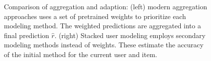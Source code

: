 \begin{figure}[t]
\begin{framed}
\begin{minipage}{0.49\textwidth}
  \end{minipage} 
  \vspace{2em}
  \caption[Comparison of Aggregation and Adaption]{
    Comparison of aggregation and adaption:
    (left) modern aggregation approaches uses a set of pretrained weights
    to prioritize each modeling method.
    The weighted predictions are aggregated into a final prediction $\hat{r}$.
    (right) Stacked user modeling employs secondary modeling methods instead
    of weights. These estimate the accuracy of the initial method
    for the current user and item.
  }
  \label{fig:stack:comparison}
\end{framed}
\end{figure}


